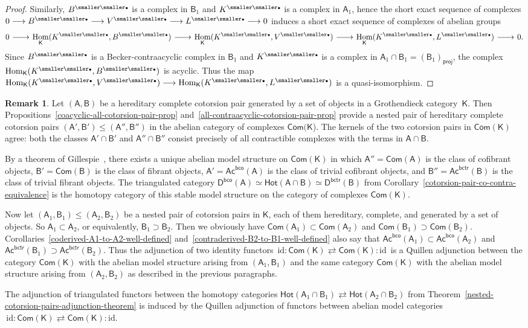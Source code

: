 \documentclass[12pt,a4paper]{amsart}
\newcommand{\+}{\nobreakdash-}
\renewcommand{\:}{\colon}
\newcommand{\rarrow}{\longrightarrow}
\newcommand{\bu}{{\text{\smaller\smaller$\scriptstyle\bullet$}}}
\newcommand{\lrarrow}{\mskip.5\thinmuskip\relbar\joinrel\relbar\joinrel
 \rightarrow\mskip.5\thinmuskip\relax}
\DeclareMathOperator{\Hom}{Hom}
\newcommand{\sA}{\mathsf A}
\newcommand{\sB}{\mathsf B}
\newcommand{\sD}{\mathsf D}
\newcommand{\sK}{\mathsf K}
\newcommand{\Hot}{\mathsf{Hot}}
\newcommand{\Com}{\mathsf{Com}}
\newcommand{\Ac}{\mathsf{Ac}}
\newcommand{\proj}{\mathsf{proj}}
\newcommand{\bco}{\mathsf{bco}}
\newcommand{\bctr}{\mathsf{bctr}}
\newcommand{\id}{\mathrm{id}}
\theoremstyle{plain}
\theoremstyle{definition}
\newtheorem{rem}[thm]{Remark}
\begin{document}
\begin{proof}
 Similarly, $B^\bu$ is a complex in $\sB_1$ and $K^\bu$ is a complex
in $\sA_1$, hence the short exact sequence of complexes
$0\rarrow B^\bu\rarrow V^\bu\rarrow L^\bu\rarrow0$ induces a short
exact sequence of complexes of abelian groups
$$
 0\lrarrow\Hom_\sK(K^\bu,B^\bu)\lrarrow\Hom_\sK(K^\bu,V^\bu)
 \lrarrow\Hom_\sK(K^\bu,L^\bu)\lrarrow0.
$$
 Since $B^\bu$ is a Becker-contraacyclic complex in $\sB_1$ and
$K^\bu$ is a complex in $\sA_1\cap\sB_1=(\sB_1)_\proj$, the complex
$\Hom_\sK(K^\bu,B^\bu)$ is acyclic.
 Thus the map $\Hom_\sK(K^\bu,V^\bu)\rarrow\Hom_\sK(K^\bu,L^\bu)$
is a quasi-isomorphism.
\end{proof}

\begin{rem}
 Let $(\sA,\sB)$ be a hereditary complete cotorsion pair generated by
a set of objects in a Grothendieck category~$\sK$.
 Then Propositions~\ref{coacyclic-all-cotorsion-pair-prop}
and~\ref{all-contraacyclic-cotorsion-pair-prop} provide a nested pair
of hereditary complete cotorsion pairs $(\sA',\sB')\le(\sA'',\sB'')$
in the abelian category of complexes $\Com(\sK$).
 The kernels of the two cotorsion pairs in $\Com(\sK)$ agree: both
the classes $\sA'\cap\sB'$ and $\sA''\cap\sB''$ consist precisely of
all contractible complexes with the terms in $\sA\cap\sB$.

 By a theorem of Gillespie~\cite[Main Theorem~1.2]{Gil2b}, there
exists a unique abelian model structure on $\Com(\sK)$ in which
$\sA''=\Com(\sA)$ is the class of cofibrant objects,
$\sB'=\Com(\sB)$ is the class of fibrant objects,
$\sA'=\Ac^\bco(\sA)$ is the class of trivial cofibrant objects,
and $\sB''=\Ac^\bctr(\sB)$ is the class of trivial fibrant objects.
 The triangulated category
$\sD^\bco(\sA)\simeq\Hot(\sA\cap\sB)\simeq\sD^\bctr(\sB)$ from
Corollary~\ref{cotorsion-pair-co-contra-equivalence} is the homotopy
category of this stable model structure on the category of complexes
$\Com(\sK)$.

 Now let $(\sA_1,\sB_1)\le(\sA_2,\sB_2)$ be a nested pair of
cotorsion pairs in $\sK$, each of them hereditary, complete, and
generated by a set of objects.
 So $\sA_1\subset\sA_2$, or equivalently, $\sB_1\supset\sB_2$.
 Then we obviously have $\Com(\sA_1)\subset\Com(\sA_2)$ and
$\Com(\sB_1)\supset\Com(\sB_2)$.
 Corollaries~\ref{coderived-A1-to-A2-well-defined}
and~\ref{contraderived-B2-to-B1-well-defined} also say that
$\Ac^\bco(\sA_1)\subset\Ac^\bco(\sA_2)$
and $\Ac^\bctr(\sB_1)\supset\Ac^\bctr(\sB_2)$.
 Thus the adjunction of two identity functors
$\,\id\:\Com(\sK)\rightleftarrows\Com(\sK):\!\id\,$ is a Quillen
adjunction between the category $\Com(\sK)$ with the abelian model
structure arising from $(\sA_1,\sB_1)$ and the same category $\Com(\sK)$
with the abelian model structure arising from $(\sA_2,\sB_2)$ as
described in the previous paragraphs.

 The adjunction of triangulated functors between the homotopy
categories $\Hot(\sA_1\cap\sB_1)\rightleftarrows\Hot(\sA_2\cap\sB_2)$
from Theorem~\ref{nested-cotorsion-pairs-adjunction-theorem} is
induced by the Quillen adjunction of functors between abelian model
categories $\,\id\:\Com(\sK)\rightleftarrows\Com(\sK):\!\id$.
\end{rem}
\end{document}
